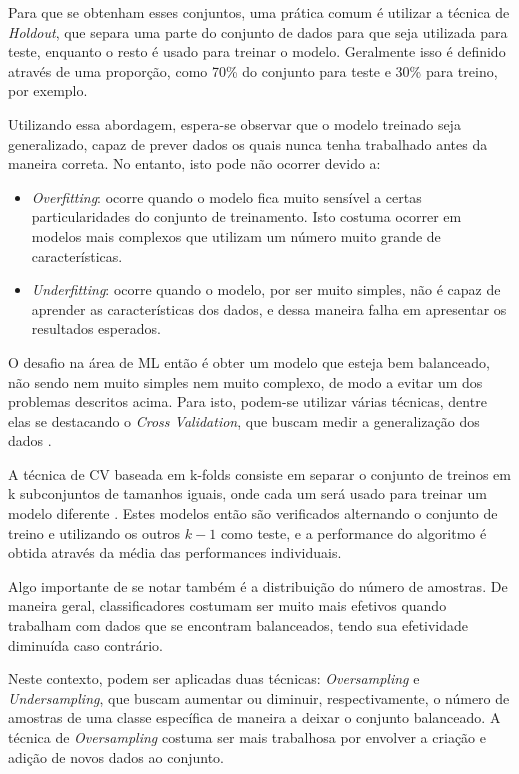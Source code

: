 Para que se obtenham esses conjuntos, uma prática comum é utilizar a técnica de \textit{Holdout}, que separa uma parte do conjunto de dados para que seja utilizada para teste, enquanto o resto é usado para treinar o modelo. Geralmente isso é definido através de uma proporção, como 70\% do conjunto para teste e 30\% para treino, por exemplo. \cite{van2010process}

Utilizando essa abordagem, espera-se observar que o modelo treinado seja generalizado, capaz de prever dados os quais nunca tenha trabalhado antes da maneira correta. No entanto, isto pode não ocorrer devido a:

\begin{itemize}
    \item \textit{Overfitting}: ocorre quando o modelo fica muito sensível a certas particularidades do conjunto de treinamento. Isto costuma ocorrer em modelos mais complexos que utilizam um número muito grande de características.
    \item \textit{Underfitting}: ocorre quando o modelo, por ser muito simples, não é capaz de aprender as características dos dados, e dessa maneira falha em apresentar os resultados esperados. 
\end{itemize}

O desafio na área de ML então é obter um modelo que esteja bem balanceado, não sendo nem muito simples nem muito complexo, de modo a evitar um dos problemas descritos acima. Para isto, podem-se utilizar várias técnicas, dentre elas se destacando o \textit{Cross Validation}, que buscam medir a generalização dos dados \cite{muller2017introduction}.

A técnica de CV baseada em k-folds consiste em separar o conjunto de treinos em k subconjuntos de tamanhos iguais, onde cada um será usado para treinar um modelo diferente . Estes modelos então são verificados alternando o conjunto de treino e utilizando os outros $k-1$ como teste, e a performance do algoritmo é obtida através da média das performances individuais. 

Algo importante de se notar também é a distribuição do número de amostras. De maneira geral, classificadores costumam ser muito mais efetivos quando trabalham com dados que se encontram balanceados, tendo sua efetividade diminuída caso contrário. \cite{yap2014application}

Neste contexto, podem ser aplicadas duas técnicas: \textit{Oversampling} e \textit{Undersampling}, que buscam aumentar ou diminuir, respectivamente, o número de amostras de uma classe específica de maneira a deixar o conjunto balanceado. A técnica de \textit{Oversampling} costuma ser mais trabalhosa por envolver a criação e adição de novos dados ao conjunto. 

